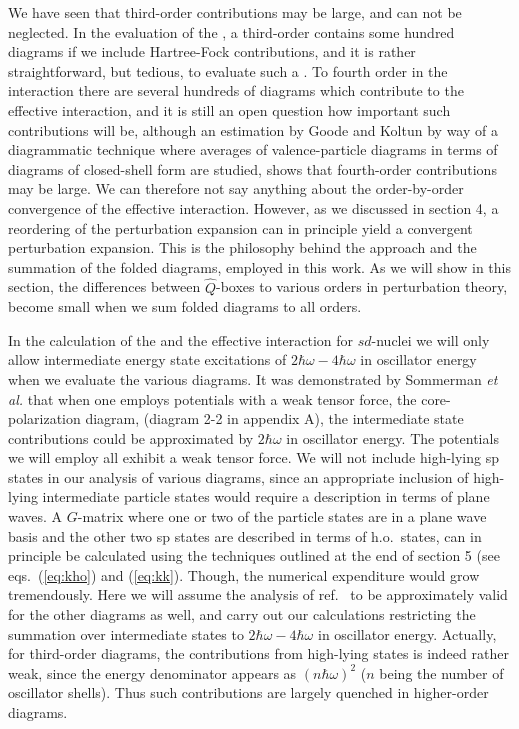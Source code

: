 We have seen that third-order contributions may be large, and
can not be neglected. In the evaluation of the \qbox, a third-order
\qbox contains some hundred diagrams if we include Hartree-Fock
contributions, and it is rather straightforward, but tedious, to
evaluate such a \qbox.
To fourth order in the interaction there are several hundreds of
diagrams which contribute to the effective interaction, and it is
still an open question how important such contributions will be, although
an estimation by Goode and Koltun \cite{gk75} by way of a diagrammatic
technique where averages of valence-particle diagrams in terms
of diagrams of closed-shell form are studied,
shows that fourth-order contributions
may be large. We can therefore not say anything about the
order-by-order convergence of the effective interaction.
However, as we discussed in section 4, a reordering of the perturbation
expansion can in principle yield a convergent perturbation
expansion. This is the philosophy behind the \qbox approach and the
summation of the folded diagrams, employed in this work. As we will show
in this section, the differences between $\hat{Q}$-boxes to various
orders in perturbation theory, become small when we sum folded diagrams
to all orders.


In the calculation of the \qbox and the
effective interaction for $sd$-nuclei
we will only allow intermediate
energy state excitations
of $2\hbar\omega -4\hbar\omega$ in oscillator energy when we evaluate
the various diagrams.
It was demonstrated by Sommerman {\em et al.} \cite{sommer}
that when one employs potentials with a weak tensor force, the
core-polarization diagram, (diagram 2-2 in
appendix A), the
intermediate state contributions could be approximated by
$2\hbar\omega$ in oscillator energy. The potentials
we will employ all exhibit a weak tensor force.
We will not include high-lying sp states in
our analysis of various \qbox diagrams, since an appropriate inclusion
of high-lying intermediate particle states would require a 
description in terms of plane waves. A $G$-matrix where
one or two of the particle states are in a plane wave basis
and the other two sp states are described in terms of 
h.o.\ states, can in principle be calculated  using the
techniques outlined at the end of section 5 (see eqs.\
(\ref{eq:kho}) and (\ref{eq:kk}). Though, the 
numerical expenditure would grow tremendously.
Here we will assume the analysis 
of ref.\ \cite{sommer} to be approximately valid for the
other diagrams as well, and carry
out our calculations restricting the summation over intermediate
states to $2\hbar\omega -4\hbar\omega$ in oscillator energy.
Actually, for third-order \qbox diagrams, the contributions from
high-lying states is indeed rather weak, since the energy
denominator appears as $(n\hbar\omega)^2$ ($n$ being the
number of oscillator shells). Thus such contributions are largely
quenched in higher-order diagrams.

